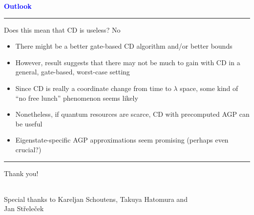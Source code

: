 \documentclass{beamer}
\def\lbt{} %
\newenvironment{dia}[2]
{
	\begin{frame}
	\vspace{1mm}
	{\small #1}
	\hfill
    {\small\bf\textcolor{blue}{#2}}
	\vspace{3mm}
	\hrule
	\bigskip
}
{
	\vfill
	\end{frame}
}
\begin{document}
\begin{dia}{\lbt}{Outlook}
Does this mean that CD is useless? \pause No \pause
\begin{itemize}
    \item There might be a better gate-based CD algorithm and/or better bounds \pause
    \item However, result suggests that there may not be much to gain with CD in a general, gate-based, worst-case setting \pause
    \item Since CD is really a coordinate change from time to $\lambda$ space, some kind of ``no free lunch'' phenomenon seems likely \pause
    \item Nonetheless, if quantum resources are scarce, CD with precomputed AGP can be useful \pause
    \item Eigenstate-specific AGP approximations seem promising (perhaps even crucial?)
\end{itemize}

\vspace{-1cm}
\end{dia}

\begin{dia}{\lbt}{}
\vspace{2.0cm}
\begin{center}
\begin{LARGE}
\textcolor{mygreen}{Thank you!}
\end{LARGE}
$ $\\[2.5cm]
Special thanks to Kareljan Schoutens, Takuya Hatomura and \\ Jan St\v{r}ele\v{c}ek
\end{center}
\vspace*{-0.5cm}
\end{dia}
\end{document}
